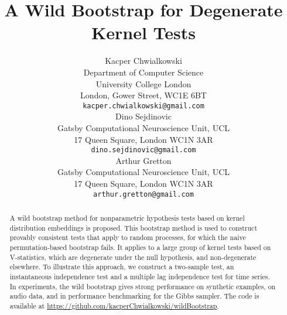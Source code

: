 \documentclass{article} %
\title{A Wild Bootstrap for Degenerate Kernel Tests}
\author{
Kacper Chwialkowski \\
Department of Computer Science\\
University College London\\
London, Gower Street, WC1E 6BT \\
\texttt{kacper.chwialkowski@gmail.com} \\
\And
Dino Sejdinovic \\
Gatsby Computational Neuroscience Unit, UCL \\
17 Queen Square, London WC1N 3AR \\
\texttt{dino.sejdinovic@gmail.com} \\
\AND
Arthur Gretton \\
Gatsby Computational Neuroscience Unit, UCL \\
17 Queen Square, London WC1N 3AR \\
\texttt{arthur.gretton@gmail.com} \\
}
\begin{document}
\maketitle

\begin{abstract}

A wild bootstrap method for nonparametric hypothesis tests based on kernel distribution embeddings is proposed. This
  bootstrap method is used to construct provably consistent tests that apply to random
  processes, for which the naive permutation-based bootstrap
  fails. It applies to a large group of kernel tests
  based on V-statistics, which are degenerate under the null
  hypothesis, and non-degenerate elsewhere. To illustrate this
  approach, we construct a two-sample test, an instantaneous independence
  test and a multiple lag independence test for time series.  In experiments, the wild
  bootstrap gives strong performance on synthetic examples, on audio
  data, and in performance benchmarking for the Gibbs sampler. The code is available at 
  \url{https://github.com/kacperChwialkowski/wildBootstrap}.    

\end{abstract}



\vspace{-4mm}




\vspace{-2mm}


\small



\newpage
\normalsize
\appendix


  
%
%
\end{document}
